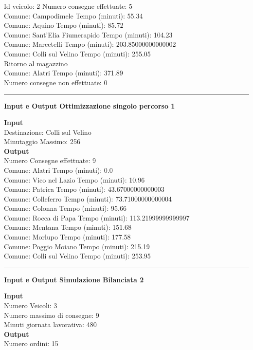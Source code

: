 \documentclass[a4paper,12pt]{report}
\begin{document}
Id veicolo: 2	Numero consegne effettuate: 5\\
Comune: Campodimele	 Tempo (minuti): 55.34\\
Comune: Aquino	 Tempo (minuti): 85.72\\
Comune: Sant'Elia Fiumerapido	 Tempo (minuti): 104.23\\
Comune: Marcetelli	 Tempo (minuti): 203.85000000000002\\
Comune: Colli sul Velino	 Tempo (minuti): 255.05\\
Ritorno al magazzino\\
Comune: Alatri	 Tempo (minuti): 371.89\\

Numero consegne non effettuate: 0\\
\hrule
\begin{center}
\textbf{Input e Output Ottimizzazione singolo percorso 1}
\end{center}
\textbf{Input}\\
Destinazione: Colli sul Velino\\
Minutaggio Massimo: 256\\
\textbf{Output}\\
Numero Consegne effettuate: 9\\
Comune: Alatri	 Tempo (minuti): 0.0\\
Comune: Vico nel Lazio	 Tempo (minuti): 10.96\\
Comune: Patrica	 Tempo (minuti): 43.67000000000003\\
Comune: Colleferro	 Tempo (minuti): 73.71000000000004\\
Comune: Colonna	 Tempo (minuti): 95.66\\
Comune: Rocca di Papa	 Tempo (minuti): 113.21999999999997\\
Comune: Mentana	 Tempo (minuti): 151.68\\
Comune: Morlupo	 Tempo (minuti): 177.58\\
Comune: Poggio Moiano	 Tempo (minuti): 215.19\\
Comune: Colli sul Velino	 Tempo (minuti): 253.95\\

\hrule
\begin{center}
\textbf{Input e Output Simulazione Bilanciata 2}
\end{center}
\textbf{Input}\\
Numero Veicoli: 3\\
Numero massimo di consegne: 9\\
Minuti giornata lavorativa: 480\\
\textbf{Output}\\
Numero ordini: 15\\
\end{document}
